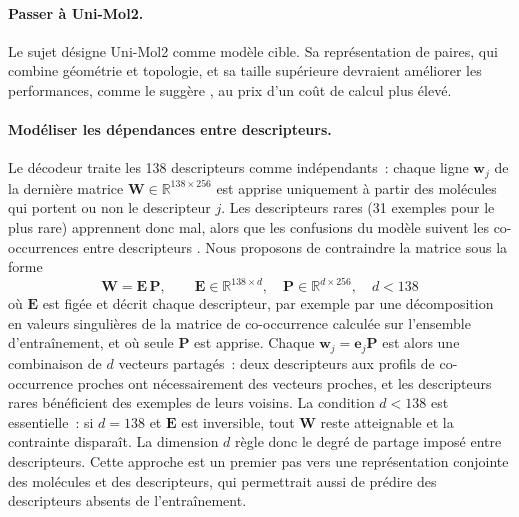 \paragraph{Passer à Uni-Mol2.}
Le sujet désigne Uni-Mol2 comme modèle cible.
Sa représentation de paires, qui combine géométrie et topologie, et sa taille supérieure devraient améliorer les performances, comme le suggère \cite{Han-2026}, au prix d'un coût de calcul plus élevé.

\paragraph{Modéliser les dépendances entre descripteurs.}
Le décodeur traite les 138 descripteurs comme indépendants~: chaque ligne $\mathbf{w}_j$ de la dernière matrice $\mathbf{W} \in \mathbb{R}^{138 \times 256}$ est apprise uniquement à partir des molécules qui portent ou non le descripteur $j$.
Les descripteurs rares (31 exemples pour le plus rare) apprennent donc mal, alors que les confusions du modèle suivent les co-occurrences entre descripteurs \cite{Han-2026}.
Nous proposons de contraindre la matrice sous la forme
\begin{equation}
   \label{eq:Factorisation}
   \mathbf{W} = \mathbf{E} \, \mathbf{P},
   \qquad
   \mathbf{E} \in \mathbb{R}^{138 \times d},
   \quad
   \mathbf{P} \in \mathbb{R}^{d \times 256},
   \quad
   d < 138
\end{equation}
où $\mathbf{E}$ est figée et décrit chaque descripteur, par exemple par une décomposition en valeurs singulières de la matrice de co-occurrence calculée sur l'ensemble d'entraînement, et où seule $\mathbf{P}$ est apprise.
Chaque $\mathbf{w}_j = \mathbf{e}_j \mathbf{P}$ est alors une combinaison de $d$ vecteurs partagés~: deux descripteurs aux profils de co-occurrence proches ont nécessairement des vecteurs proches, et les descripteurs rares bénéficient des exemples de leurs voisins.
La condition $d < 138$ est essentielle~: si $d = 138$ et $\mathbf{E}$ est inversible, tout $\mathbf{W}$ reste atteignable et la contrainte disparaît.
La dimension $d$ règle donc le degré de partage imposé entre descripteurs.
Cette approche est un premier pas vers une représentation conjointe des molécules et des descripteurs, qui permettrait aussi de prédire des descripteurs absents de l'entraînement.

